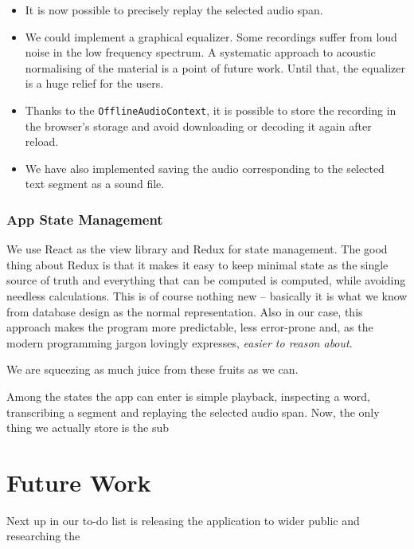\documentclass{llncs}
\begin{document}
\begin{itemize}
\item{It is now possible to precisely replay the selected audio span.}
\item{
    We could implement a graphical equalizer. Some recordings suffer from loud
    noise in the low frequency spectrum. A systematic approach to acoustic
    normalising of the material is a point of future work. Until that, the
    equalizer is a huge relief for the users.
}
\item{
    Thanks to the \texttt{OfflineAudioContext}, it is possible to store the
    recording in the browser's storage and avoid downloading or decoding it
    again after reload.
}
\item{
    We have also implemented saving the audio corresponding to the selected text
    segment as a sound file.
}
\end{itemize}

\subsubsection{App State Management}

We use React as the view library and Redux for state management. The good thing
about Redux is that it makes it easy to keep minimal state as the single source
of truth and everything that can be computed is computed, while avoiding
needless calculations. This is of course nothing new -- basically it is what we
know from database design as the normal representation. Also in our case, this
approach makes the program more predictable, less error-prone and, as the modern
programming jargon lovingly expresses, {\em easier to reason about}.

We are squeezing as much juice from these fruits as we can.

Among the states the app can enter is simple playback, inspecting a word,
transcribing a segment and replaying the selected audio span. Now, the only
thing we actually store is the sub

\section{Future Work}

Next up in our to-do list is releasing the application to wider public and
researching the 


\end{document}

